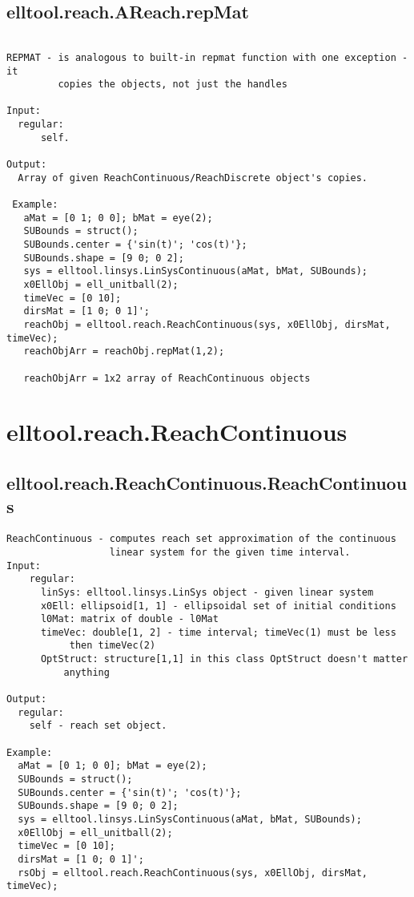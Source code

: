 \subsection{\texorpdfstring{elltool.reach.AReach.repMat}{repMat}}\label{method:elltool.reach.AReach.repMat}
\begin{verbatim}

REPMAT - is analogous to built-in repmat function with one exception - it
         copies the objects, not just the handles

Input:
  regular:
      self.

Output:
  Array of given ReachContinuous/ReachDiscrete object's copies.

 Example:
   aMat = [0 1; 0 0]; bMat = eye(2);
   SUBounds = struct();
   SUBounds.center = {'sin(t)'; 'cos(t)'};
   SUBounds.shape = [9 0; 0 2];
   sys = elltool.linsys.LinSysContinuous(aMat, bMat, SUBounds);
   x0EllObj = ell_unitball(2);
   timeVec = [0 10];
   dirsMat = [1 0; 0 1]';
   reachObj = elltool.reach.ReachContinuous(sys, x0EllObj, dirsMat, timeVec);
   reachObjArr = reachObj.repMat(1,2);

   reachObjArr = 1x2 array of ReachContinuous objects
\end{verbatim}
\section{elltool.reach.ReachContinuous}\label{secClassDescr:elltool.reach.ReachContinuous}
\subsection{\texorpdfstring{elltool.reach.ReachContinuous.ReachContinuous}{ReachContinuous}}\label{method:elltool.reach.ReachContinuous.ReachContinuous}
\begin{verbatim}
ReachContinuous - computes reach set approximation of the continuous
                  linear system for the given time interval.
Input:
    regular:
      linSys: elltool.linsys.LinSys object - given linear system
      x0Ell: ellipsoid[1, 1] - ellipsoidal set of initial conditions
      l0Mat: matrix of double - l0Mat
      timeVec: double[1, 2] - time interval; timeVec(1) must be less
           then timeVec(2)
      OptStruct: structure[1,1] in this class OptStruct doesn't matter
          anything

Output:
  regular:
    self - reach set object.

Example:
  aMat = [0 1; 0 0]; bMat = eye(2);
  SUBounds = struct();
  SUBounds.center = {'sin(t)'; 'cos(t)'};
  SUBounds.shape = [9 0; 0 2];
  sys = elltool.linsys.LinSysContinuous(aMat, bMat, SUBounds);
  x0EllObj = ell_unitball(2);
  timeVec = [0 10];
  dirsMat = [1 0; 0 1]';
  rsObj = elltool.reach.ReachContinuous(sys, x0EllObj, dirsMat, timeVec);
\end{verbatim}


